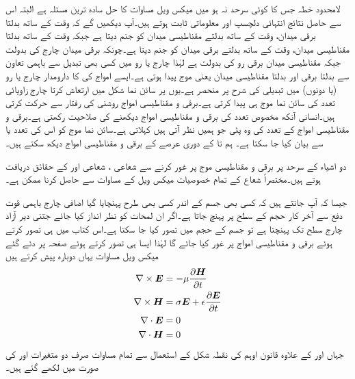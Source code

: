 لامحدود خطہ جس کا کوئی سرحد نہ ہو میں میکس ویل مساوات کا حل سادہ ترین مسئلہ ہے البتہ اس سے حاصل نتائج انتہائی دلچسپ اور معلوماتی ثابت ہوتے ہیں۔آپ دیکھیں گے کہ وقت کے ساتھ بدلتا برقی میدان، وقت کے ساتھ بدلتے مقناطیسی میدان کو جنم دیتا ہے جبکہ وقت کے ساتھ بدلتا مقناطیسی میدان، وقت کے ساتھ بدلتے برقی میدان کو جنم دیتا ہے۔چونکہ برقی میدان چارج کی بدولت جبکہ مقناطیسی میدان برقی رو کی بدولت ہے لہٰذا چارج یا رو میں کسی بھی تبدیل سے  باہمی تعاون سے بدلتا برقی اور بدلتا مقناطیسی میدان یعنی  موج پیدا ہوتی ہے۔ایسے امواج کی  کا دارومدار چارج یا رو (یا دونوں) میں تبدیلی کی شرح پر منحصر ہے۔یوں   پر سائن نما شکل میں ارتعاش کرتا چارج  زاویائی تعدد کی سائن نما موج ہی پیدا کرتی ہے۔برقی و مقناطیسی امواج  روشنی کی رفتار سے حرکت کرتی ہیں۔انسانی آنکھ مخصوص تعدد کی برقی و مقناطیسی امواج دیکھنے کی صلاحیت رکھتی ہے۔برقی و مقناطیسی امواج کے تعدد کی وہ پٹی جو ہمیں نظر آتی ہیں  کہلاتی ہے۔سائن نما موج کو اس کی تعدد  یا   سے بیان کیا جا سکتا ہے۔ ہم  تا  کے دوری عرصے کے برقی و مقناطیسی امواج دیکھ سکتے ہیں۔

دو اشیاء کے سرحد پر برقی و مقناطیسی موج پر غور کرنے سے  شعاعی ، شعاعی  اور   کے حقائق دریافت ہوتے ہیں۔مختصراً شعاع کے تمام خصوصیات میکس ویل کے مساوات سے حاصل کرنا ممکن ہے۔

جیسا کہ آپ جانتے ہیں کہ کسی بھی جسم کے اندر کسی بھی طرح پہنچایا گیا اضافی چارج باہمی قوت دفع سے آخر کار حجم کے سطح پر پہنچ جاتا ہے۔اگر ان لمحات کو نظر انداز کیا جائے جتنی دیر آزاد چارج سطح تک پہنچتا ہے تو جسم کے حجم میں  تصور کیا جا سکتا ہے۔اس کتاب میں  ہی تصور کرتے ہوئے برقی و مقناطیسی امواج پر غور کیا جائے گا لہٰذا ایسا ہی تصور کرتے ہوئے صفحہ  پر دئے گئے میکس ویل مساوات یہاں دوبارہ پیش کرتے ہیں
\begin{align}
\nabla \times {\ensuremath{{\boldsymbol{E}}}}&=-\mu \frac{\partial {\ensuremath{{\boldsymbol{H}}}}}{\partial t}  \label{مساوات_موج_میکس_ویل_خالی_خلاء_الف}\\
\nabla \times {\ensuremath{{\boldsymbol{H}}}}&=\sigma {\ensuremath{{\boldsymbol{E}}}}+\epsilon \frac{\partial {\ensuremath{{\boldsymbol{E}}}}}{\partial t}  \label{مساوات_موج_میکس_ویل_خالی_خلاء_ب}\\
\nabla \cdot {\ensuremath{{\boldsymbol{E}}}}&=0 \label{مساوات_موج_میکس_ویل_خالی_خلاء_پ}\\
\nabla \cdot {\ensuremath{{\boldsymbol{H}}}}&=0  \label{مساوات_موج_میکس_ویل_خالی_خلاء_ت}
\end{align}
جہاں  اور  کے علاوہ قانون اوہم کی نقطہ شکل  کے  استعمال سے تمام مساوات صرف دو متغیرات  اور  کی صورت میں لکھے گئے ہیں۔

